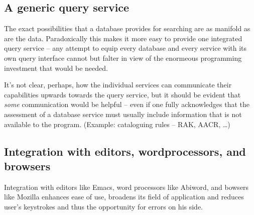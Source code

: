 \subsection{A generic query service}
\label{sec:genquery}

The exact possibilities that a database provides for searching are as
manifold as are the data. Paradoxically this makes it more easy to
provide one integrated query service -- any attempt to equip every
database and every service with its own query interface cannot but
falter in view of the enormeous programming investment that would be
needed.

It's not clear, perhaps, how the individual services can communicate
their capabilities upwards towards the query service, but it should be
evident that \textit{some} communication would be helpful -- even if
one fully acknowledges that the assessment of a database service must
usually include information that is not available to the
program. (Example: cataloguing rules -- RAK, AACR, \dots)





\subsection{Integration with editors, wordprocessors, and browsers}
\label{sec:wpintegr}

Integration with editors like Emacs, word processors like Abiword, and
bowsers like Mozilla enhances ease of use, broadens its field of
application and reduces user's keystrokes and thus the opportunity for
errors on his side.


